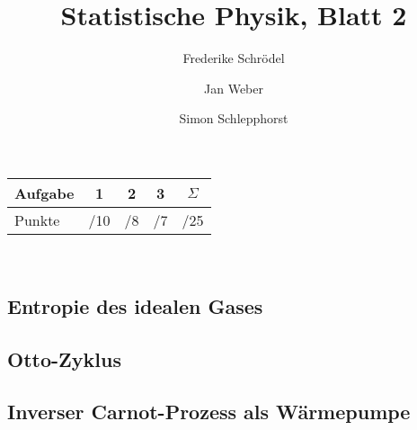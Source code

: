 \documentclass[11pt, ngerman, fleqn, DIV=15, headinclude]{scrartcl}
\title{Statistische Physik, Blatt 2}
\author{
    Frederike Schrödel \and Jan Weber \and Simon Schlepphorst
}
\begin{document}
\maketitle
\begin{center}
	\begin{tabular}{l|c|c|c|c}
		Aufgabe &1&2&3&$\Sigma$\\
		\hline
		Punkte &\quad /10 & \quad /8 & \quad /7 & \quad /25 
	\end{tabular}\\
\end{center}


\setcounter{section}{2}

\subsection{Entropie des idealen Gases}

\subsection{Otto-Zyklus}

\subsection{Inverser Carnot-Prozess als Wärmepumpe}
\end{document}
